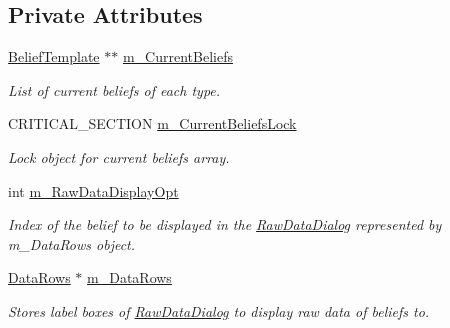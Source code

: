 \subsection*{Private Attributes}
\begin{DoxyCompactItemize}
\item 
\hypertarget{class_belief_collection_a221dbe1b2408a8b32145e058de0bed4d}{
\hyperlink{class_belief_template}{BeliefTemplate} $\ast$$\ast$ \hyperlink{class_belief_collection_a221dbe1b2408a8b32145e058de0bed4d}{m\_\-CurrentBeliefs}}
\label{class_belief_collection_a221dbe1b2408a8b32145e058de0bed4d}

\begin{DoxyCompactList}\small\item\em List of current beliefs of each type. \end{DoxyCompactList}\item 
\hypertarget{class_belief_collection_a41ac5b2e1130fa3ca5f78c2b4bdda8ba}{
CRITICAL\_\-SECTION \hyperlink{class_belief_collection_a41ac5b2e1130fa3ca5f78c2b4bdda8ba}{m\_\-CurrentBeliefsLock}}
\label{class_belief_collection_a41ac5b2e1130fa3ca5f78c2b4bdda8ba}

\begin{DoxyCompactList}\small\item\em Lock object for current beliefs array. \end{DoxyCompactList}\item 
\hypertarget{class_belief_collection_a4553ea7587fb23189b7f3c2d2e4d7fc4}{
int \hyperlink{class_belief_collection_a4553ea7587fb23189b7f3c2d2e4d7fc4}{m\_\-RawDataDisplayOpt}}
\label{class_belief_collection_a4553ea7587fb23189b7f3c2d2e4d7fc4}

\begin{DoxyCompactList}\small\item\em Index of the belief to be displayed in the \hyperlink{class_raw_data_dialog}{RawDataDialog} represented by m\_\-DataRows object. \end{DoxyCompactList}\item 
\hypertarget{class_belief_collection_a5ba1bd050a1090c81963286c1c981e46}{
\hyperlink{struct_data_rows}{DataRows} $\ast$ \hyperlink{class_belief_collection_a5ba1bd050a1090c81963286c1c981e46}{m\_\-DataRows}}
\label{class_belief_collection_a5ba1bd050a1090c81963286c1c981e46}

\begin{DoxyCompactList}\small\item\em Stores label boxes of \hyperlink{class_raw_data_dialog}{RawDataDialog} to display raw data of beliefs to. \end{DoxyCompactList}\end{DoxyCompactItemize}
